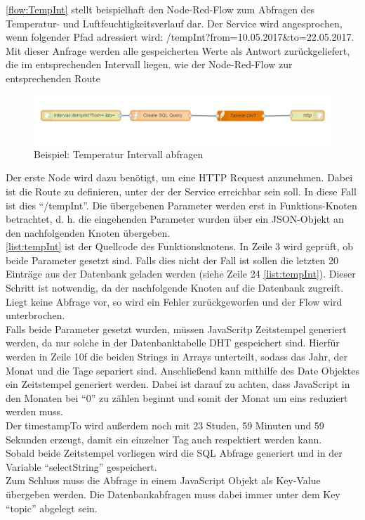 \autoref{flow:TempInt} stellt beispielhaft den Node-Red-Flow zum Abfragen des Temperatur- und Luftfeuchtigkeitsverlauf dar. Der Service wird angesprochen, wenn folgender Pfad adressiert wird: /tempInt?from=10.05.2017\&to=22.05.2017. Mit dieser Anfrage werden alle gespeicherten Werte als Antwort zurückgeliefert, die im entsprechenden Intervall liegen. wie der Node-Red-Flow zur entsprechenden Route 

\begin{figure}[h]
	\centering
	\includegraphics[scale=0.7]{images/tempIntFlow}
	\caption{Beispiel: Temperatur Intervall abfragen}
	\label{flow:TempInt}
\end{figure}
Der erste Node wird dazu benötigt, um eine HTTP Request anzunehmen. Dabei ist die Route zu definieren, unter der der Service erreichbar sein soll. In diese Fall ist dies \enquote{/tempInt}. Die übergebenen Parameter werden erst in Funktions-Knoten betrachtet, d. h. die eingehenden Parameter wurden über ein JSON-Objekt an den nachfolgenden Knoten übergeben. 
\\\autoref{list:tempInt} ist der Quellcode des Funktionsknotens. In Zeile 3 wird geprüft, ob beide Parameter gesetzt sind. Falls dies nicht der Fall ist sollen die letzten 20 Einträge aus der Datenbank geladen werden (siehe Zeile 24 \autoref{list:tempInt}). Dieser Schritt ist notwendig, da der nachfolgende Knoten auf die Datenbank zugreift. Liegt keine Abfrage vor, so wird ein Fehler zurückgeworfen und der Flow wird unterbrochen. 
\\Falls beide Parameter gesetzt wurden, müssen JavaScritp Zeitstempel generiert werden, da nur solche in der Datenbanktabelle DHT gespeichert sind. Hierfür werden in Zeile 10f die beiden Strings in Arrays unterteilt, sodass das Jahr, der Monat und die Tage separiert sind. Anschließend kann mithilfe des Date Objektes ein Zeitstempel generiert werden. Dabei ist darauf zu achten, dass JavaScript in den Monaten bei \enquote{0} zu zählen beginnt und somit der Monat um eins reduziert werden muss. \\Der timestampTo wird außerdem noch mit 23 Studen, 59 Minuten und 59 Sekunden erzeugt, damit ein einzelner Tag auch respektiert werden kann. \\Sobald beide Zeitstempel vorliegen wird die \ac{SQL} Abfrage generiert und in der Variable \enquote{selectString} gespeichert. \\Zum Schluss muss die Abfrage in einem JavaScript Objekt als Key-Value übergeben werden. Die Datenbankabfragen muss dabei immer unter dem Key \enquote{topic} abgelegt sein.  
